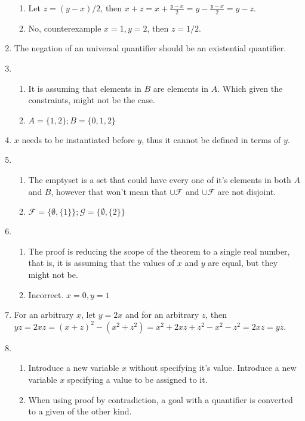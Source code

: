 \begin{enumerate}
\begin{enumerate}
        \item
    Let $z = (y - x) / 2$, then $x + z = x + \frac{y - x}{2} = y - \frac{y - x}{2} = y - z$.
        \item 
    No, counterexample $x = 1, y = 2$, then $z = 1/2$.
    \end{enumerate}
    \item
    The negation of an universal quantifier should be an existential quantifier.
    \item
    \begin{enumerate}
        \item
    It is assuming that elements in $B$ are elements in $A$. Which given the constraints, might not be the case.
        \item
    $A = \{1,2\}; B = \{0,1,2\}$ 
    \end{enumerate}
    \item
    $x$ needs to be instantiated before $y$, thus it cannot be defined in terms of $y$.
    \item
    \begin{enumerate}
        \item 
    The emptyset is a set that could have every one of it's elements in both $A$ and $B$, however that won't mean that $\cup \mathscr{F}$ and $\cup \mathscr{F}$ are not disjoint.
        \item 
    $\mathscr{F} = \{\emptyset, \{1\}\}; \mathscr{G} = \{\emptyset, \{2\}\}$
    \end{enumerate}
    \item
    \begin{enumerate}
        \item
    The proof is reducing the scope of the theorem to a single real number, that is, it is assuming that the values of $x$ and $y$ are equal, but they might not be.
        \item 
    Incorrect. $x=0, y=1$
    \end{enumerate}
    \item
    For an arbitrary $x$, let $y = 2x$ and for an arbitrary $z$, then $yz = 2xz = (x + z)^2 - (x^2 + z^2)= x^2 + 2xz + z^2 - x^2 - z^2 = 2xz = yz$.
    \item
    \begin{enumerate}
        \item 
    Introduce a new variable $x$ without specifying it's value.
    Introduce a new variable $x$ specifying a value to be assigned to it.
        \item 
    When using proof by contradiction, a goal with a quantifier is converted to a given of the other kind.
    \end{enumerate}
\end{enumerate}
